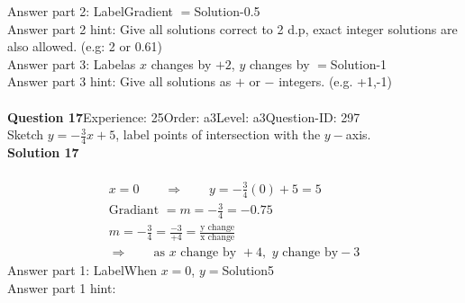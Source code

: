 \documentclass{article}
\begin{document}
Answer part 2: \hspace{10pt}Label\hspace{10pt}Gradient $=$\hspace{10pt}Solution\hspace{10pt}-0.5\\
Answer part 2 hint: \hspace{15pt}Give all solutions correct to 2 d.p, exact integer solutions are also allowed. (e.g: 2 or 0.61)\\
Answer part 3: \hspace{10pt}Label\hspace{10pt}as $x$ changes by $+2$, $y$ changes by $=$\hspace{10pt}Solution\hspace{10pt}-1\\
Answer part 3 hint: \hspace{15pt}Give all solutions as $+$ or $-$ integers. (e.g. +1,-1)\\
\\[4pt]
\noindent\textbf{Question 17}\hspace{20pt}Experience: 25\hspace{20pt}Order: a3\hspace{20pt}Level: a3\hspace{20pt}Question-ID: 297\\[2pt]
Sketch $y=-\displaystyle\frac{3}{4}x+5$, label points of intersection with the $y-$axis.\\[4pt]
\noindent\textbf{Solution 17}\\[2pt]
\\[-35pt]\begin{align*}
&x=0\qquad\Rightarrow\qquad y=-\displaystyle\frac{3}{4}(0)+5=5&\\[2pt]
&\text{Gradiant}\,\,=m=-\displaystyle\frac{3}{4}=-0.75&\\[2pt]
&m=-\displaystyle\frac{3}{4}=\displaystyle\frac{-3}{+4}=\displaystyle\frac{\text{y change}}{\text{x change}}&\\[2pt]
& \Rightarrow\qquad \text{as}\,\, x \,\,\text{change by } +4,\,\, y\,\, \text{change by} -3 &
\end{align*}
Answer part 1: \hspace{10pt}Label\hspace{10pt}When $x=0$, $y=$\hspace{10pt}Solution\hspace{10pt}5\\
Answer part 1 hint: \hspace{15pt}\\
\end{document}
